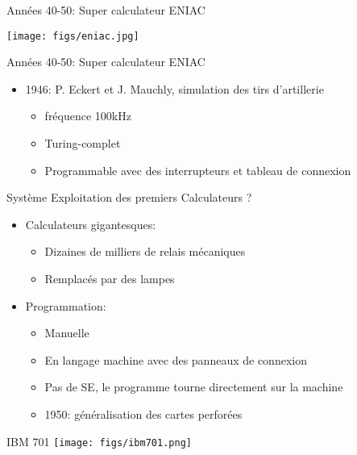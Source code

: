 \documentclass[11pt]{beamer}
\begin{document}
\begin{frame}{Années 40-50: Super calculateur ENIAC}

\centering
\texttt{[image: figs/eniac.jpg]}
\end{frame}


\begin{frame}{Années 40-50: Super calculateur ENIAC}

\begin{itemize}
\itemsep1pt\parskip0pt
\item
  1946: P. Eckert et J. Mauchly, simulation des tirs d'artillerie

  \begin{itemize}
  \itemsep1pt\parskip0pt
  \item
    fréquence 100kHz
  \item
    Turing-complet
  \item
    Programmable avec des interrupteurs et tableau de connexion
  \end{itemize}
\end{itemize}
\end{frame}

\begin{frame}{Système Exploitation des premiers Calculateurs ?}

\begin{itemize}
\itemsep1pt\parskip0pt
\item
  Calculateurs gigantesques:

  \begin{itemize}
  \itemsep1pt\parskip0pt
  \item
    Dizaines de milliers de relais mécaniques
  \item
    Remplacés par des lampes
  \end{itemize}
\item
  Programmation:
  \begin{itemize}
  \item
    Manuelle
  \item
    En langage machine avec des panneaux de connexion
  \item
    Pas de SE, le programme tourne directement sur la machine
  \item
    1950: généralisation des cartes perforées
  \end{itemize}
\end{itemize}
\end{frame}

\begin{frame}{IBM 701}
  \centering
  \texttt{[image: figs/ibm701.png]}
\end{frame}
\end{document}
